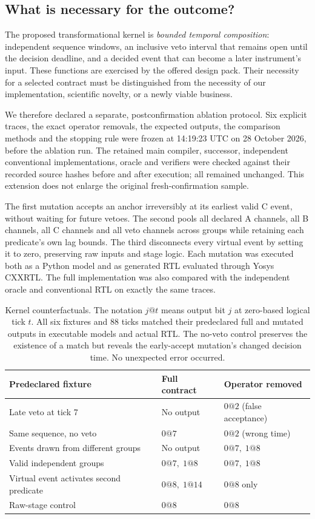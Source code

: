 \subsection{What is necessary for the outcome?}
The proposed transformational kernel is \emph{bounded temporal composition}: independent sequence windows, an inclusive veto interval that remains open until the decision deadline, and a decided event that can become a later instrument's input. These functions are exercised by the offered design pack. Their necessity for a selected contract must be distinguished from the necessity of our implementation, scientific novelty, or a newly viable business.

We therefore declared a separate, postconfirmation ablation protocol. Six explicit traces, the exact operator removals, the expected outputs, the comparison methods and the stopping rule were frozen at 14:19:23 UTC on 28 October 2026, before the ablation run. The retained main compiler, successor, independent conventional implementations, oracle and verifiers were checked against their recorded source hashes before and after execution; all remained unchanged. This extension does not enlarge the original fresh-confirmation sample.

The first mutation accepts an anchor irreversibly at its earliest valid C event, without waiting for future vetoes. The second pools all declared A channels, all B channels, all C channels and all veto channels across groups while retaining each predicate's own lag bounds. The third disconnects every virtual event by setting it to zero, preserving raw inputs and stage logic. Each mutation was executed both as a Python model and as generated RTL evaluated through Yosys CXXRTL. The full implementation was also compared with the independent oracle and conventional RTL on exactly the same traces.

\begin{table}[htbp]
\centering\small
\begin{tabular}{L{0.35\textwidth}L{0.25\textwidth}L{0.25\textwidth}}
\toprule Predeclared fixture & Full contract & Operator removed\\
\midrule
Late veto at tick 7 & No output & $0@2$ (false acceptance)\\
Same sequence, no veto & $0@7$ & $0@2$ (wrong time)\\
Events drawn from different groups & No output & $0@7,\;1@8$\\
Valid independent groups & $0@7,\;1@8$ & $0@7,\;1@8$\\
Virtual event activates second predicate & $0@8,\;1@14$ & $0@8$ only\\
Raw-stage control & $0@8$ & $0@8$\\
\bottomrule
\end{tabular}
\caption{Kernel counterfactuals. The notation $j@t$ means output bit $j$ at zero-based logical tick $t$. All six fixtures and 88 ticks matched their predeclared full and mutated outputs in executable models and actual RTL. The no-veto control preserves the existence of a match but reveals the early-accept mutation's changed decision time. No unexpected error occurred.}
\end{table}

